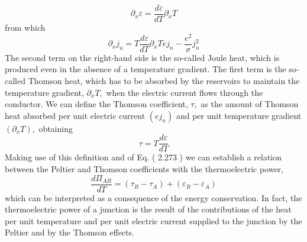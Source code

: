 \documentclass[\main/main.tex]{subfiles}
\begin{document}
$$
\partial_{x} \varepsilon=\frac{d \varepsilon}{d T} \partial_{x} T
$$
from which
$$
\partial_{x} j_{u}=T \frac{d \varepsilon}{d T} \partial_{x} T e j_{n}-\frac{e^{2}}{\sigma} j_{n}^{2}
$$
The second term on the right-hand side is the so-called Joule heat, which is produced even in the absence of a temperature gradient. The first term is the so-called Thomson heat, which has to be absorbed by the reservoirs to maintain the temperature gradient, $\partial_{x} T,$ when the electric current flows through the conductor. We can define the Thomson coefficient, $\tau,$ as the amount of Thomson heat absorbed per unit electric current $\left(e j_{n}\right)$ and per unit temperature gradient $\left(\partial_{x} T\right),$ obtaining
$$
\tau=T \frac{d \varepsilon}{d T}
$$
Making use of this definition and of Eq. ( 2.273 ) we can establish a relation between the Peltier and Thomson coefficients with the thermoelectric power,
$$
\frac{d \Pi_{A B}}{d T}=\left(\tau_{B}-\tau_{A}\right)+\left(\varepsilon_{B}-\varepsilon_{A}\right)
$$
which can be interpreted as a consequence of the energy conservation. In fact, the thermoelectric power of a junction is the result of the contributions of the heat per unit temperature and per unit electric current supplied to the junction by the Peltier and by the
Thomson effects.
\end{document}
